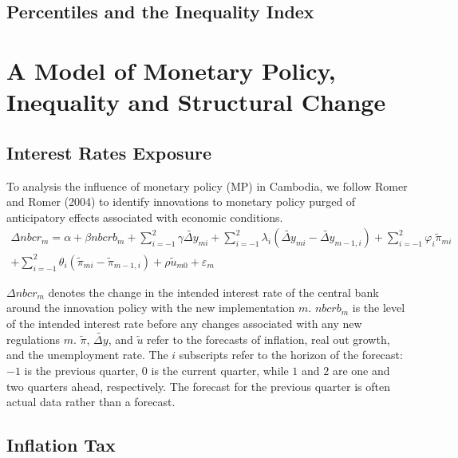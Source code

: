 \documentclass[11pt,letterpaper]{article}
\begin{document}
\subsection{Percentiles and the Inequality Index}	

\section{A Model of Monetary Policy, Inequality and Structural Change}\label{sec:model}

\subsection{Interest Rates Exposure}
To analysis the influence  of monetary policy (MP) in Cambodia, we follow Romer and Romer (2004) to identify innovations to monetary policy purged of anticipatory effects associated with economic conditions. 
\begin{equation}\begin{split}
\Delta nbcr_{m} = \alpha + \beta nbcrb_{m} + \sum_{i = -1}^{2}{\gamma \widetilde{\Delta y}_{mi}} + \sum_{i = -1}^{2} \lambda_{i} (\widetilde{\Delta y}_{mi} - \widetilde{\Delta y}_{m-1, i}) + \sum_{i = -1}^{2} \varphi_{i}\widetilde{\pi}_{mi} \\
+ \sum_{i = -1}^{2}\theta_{i}(\widetilde\pi_{mi} - \widetilde\pi_{m-1, i}) + \rho \widetilde{u}_{m0} + \varepsilon_{m}
\end{split}\end{equation}

$\Delta nbcr_{m}$ denotes the change in the intended interest rate of the central bank around the innovation policy with the new implementation $m$. $nbcrb_{m}$ is the level of the intended interest rate before any changes associated with any new regulations $m$. $\widetilde{\pi}$, $\widetilde{\Delta y}$, and $\widetilde{u}$ refer to the forecasts of inflation, real out growth, and the unemployment rate. The $i$ subscripts refer to the horizon of the forecast: $-1$ is the previous quarter, $0$ is the current quarter, while $1$ and $2$ are one and two quarters ahead, respectively. The forecast for the previous quarter is often actual data rather than a forecast.  

\subsection{Inflation Tax}
\end{document}
